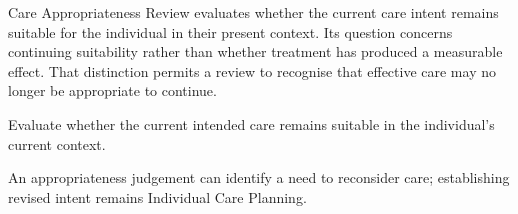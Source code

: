 Care Appropriateness Review evaluates whether the current care intent remains suitable for the individual in their present context. Its question concerns continuing suitability rather than whether treatment has produced a measurable effect. That distinction permits a review to recognise that effective care may no longer be appropriate to continue.



Evaluate whether the current intended care remains suitable in the individual’s current context.



An appropriateness judgement can identify a need to reconsider care; establishing revised intent remains Individual Care Planning.


